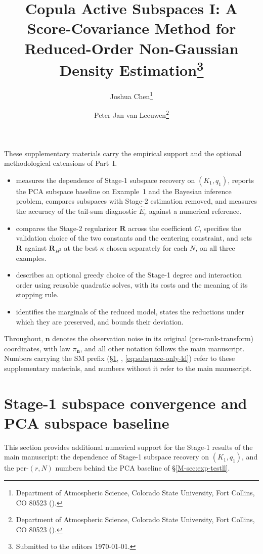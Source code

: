 \documentclass[supplement,review,hidelinks,onefignum,onetabnum]{siamart251216}
\title{Copula Active Subspaces I: A Score-Covariance Method for Reduced-Order Non-Gaussian Density Estimation\thanks{Submitted to the editors \today. \funding{This work was supported by the Consortium for Advanced Data Assimilation Research and Education (CADRE), funded by NOAA under grant 2007893.}}}
\author{%
  Joshua Chen\thanks{Department of Atmospheric Science, Colorado State University, Fort Collins, CO 80523 (\email{Joshua.Chen@colostate.edu}).}
  \and
  Peter Jan van Leeuwen\thanks{Department of Atmospheric Science, Colorado State University, Fort Collins, CO 80523 (\email{Peter.vanLeeuwen@colostate.edu}).}
}
\newcommand{\mR}{\bm{R}}
\newcommand{\vn}{\bm{n}}
\begin{document}
\maketitle

These supplementary materials carry the empirical support and the optional methodological extensions of Part~I.
\begin{itemize}
\item {} measures the dependence of Stage-1 subspace recovery on $(K_1, q_1)$, reports the PCA subspace baseline on Example~1 and the Bayesian inference problem, compares subspaces with Stage-2 estimation removed, and measures the accuracy of the tail-sum diagnostic $\widehat E_r$ against a numerical reference.
\item {} compares the Stage-2 regularizer $\mR$ across the coefficient $C$, specifies the validation choice of the two constants and the centering constraint, and sets $\mR$ against $\mR_{H^2}$ at the best $\kappa$ chosen separately for each $N$, on all three examples.
\item {} describes an optional greedy choice of the Stage-1 degree and interaction order using reusable quadratic solves, with its costs and the meaning of its stopping rule.
\item {} identifies the marginals of the reduced model, states the reductions under which they are preserved, and bounds their deviation.
\end{itemize}
Throughout, $\vn$ denotes the observation noise in its original (pre-rank-transform) coordinates, with law $\pi_{\vn}$, and all other notation follows the main manuscript. Numbers carrying the SM prefix (\S\ref{sm:rate-real}, , \eqref{eq:subspace-only-kl}) refer to these supplementary materials, and numbers without it refer to the main manuscript.


\section{Stage-1 subspace convergence and PCA subspace baseline}
\label{sm:rate-real}

This section provides additional numerical support for the Stage-1 results of the main manuscript: the dependence of Stage-1 subspace recovery on $(K_1, q_1)$, and the per-$(r, N)$ numbers behind the PCA baseline of \S\ref{M-sec:exp-testll}.
\end{document}
